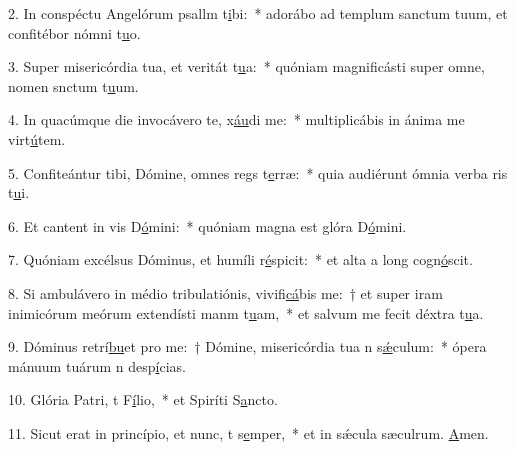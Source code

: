 2. In conspéctu Angelórum psallm t\uline{i}bi:~* adorábo ad templum sanctum tuum, et confitébor nómni t\uline{u}o.\par 
3. Super misericórdia tua, et veritát t\uline{u}a:~* quóniam magnificásti super omne, nomen snctum t\uline{u}um.\par 
4. In quacúmque die invocávero te, x\uline{áu}di me:~* multiplicábis in ánima me virt\uline{ú}tem.\par 
5. Confiteántur tibi, Dómine, omnes regs t\uline{e}rræ:~* quia audiérunt ómnia verba ris t\uline{u}i.\par 
6. Et cantent in vis D\uline{ó}mini:~* quóniam magna est glóra D\uline{ó}mini.\par 
7. Quóniam excélsus Dóminus, et humíli r\uline{é}spicit:~* et alta a long cogn\uline{ó}scit.\par 
8. Si ambulávero in médio tribulatiónis, vivifi\uline{cá}bis me:~† et super iram inimicórum meórum extendísti manm t\uline{u}am,~* et salvum me fecit déxtra t\uline{u}a.\par 
9. Dóminus retrí\uline{bu}et pro me:~† Dómine, misericórdia tua n s\uline{ǽ}culum:~* ópera mánuum tuárum n desp\uline{í}cias.\par 
10. Glória Patri, t F\uline{í}lio,~* et Spiríti S\uline{a}ncto.\par 
11. Sicut erat in princípio, et nunc, t s\uline{e}mper,~* et in sǽcula sæculrum. \uline{A}men.\par 
